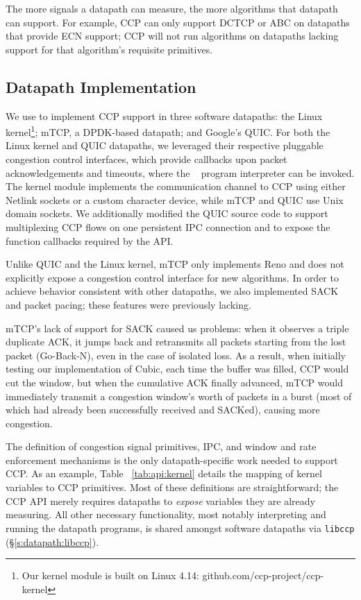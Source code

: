 The more signals a datapath can measure, the more algorithms that datapath can support. For example, CCP can only support DCTCP \cite{DCTCP} or ABC \cite{abc} on datapaths that provide ECN support; CCP will not run algorithms on datapaths lacking support for that algorithm’s requisite primitives.

\subsection{Datapath Implementation}
\label{s:datapath:software_datapaths}
We use  to implement CCP support in three software datapaths: the Linux kernel\footnote{Our kernel module is built on Linux 4.14: github.com/ccp-project/ccp-kernel}; mTCP, a DPDK-based datapath; and Google's QUIC.
For both the Linux kernel and QUIC datapaths, we leveraged their respective pluggable congestion control interfaces, which provide callbacks upon packet acknowledgements and timeouts, where the ~ program interpreter can be invoked.
The kernel module implements the communication channel to CCP using either Netlink sockets or a custom
character device, while mTCP and QUIC use Unix domain sockets.
We additionally modified the QUIC source code to support multiplexing CCP flows on one persistent IPC connection and to expose the function callbacks required by the  API.

Unlike QUIC and the Linux kernel, mTCP only implements Reno and does not explicitly expose a congestion control interface for new algorithms. 
In order to achieve behavior consistent with other datapaths, we also implemented SACK and packet pacing; these features were previously lacking.

mTCP's lack of support for SACK caused us problems: when it observes a triple duplicate ACK, 
it jumps back and retransmits all packets starting from the lost packet (\ie Go-Back-N), even in the case of isolated loss.
As a result, when initially testing our implementation of Cubic, each time the buffer was filled, CCP
would cut the window, but when the cumulative ACK finally advanced, mTCP would immediately transmit a congestion window’s worth of packets in a burst (most of which had already been successfully received and SACKed), causing more congestion. 

The definition of congestion signal primitives, IPC, and window and rate enforcement mechanisms is the only datapath-specific work needed to support CCP.
As an example, Table ~\ref{tab:api:kernel} details the mapping of kernel variables to CCP primitives.
Most of these definitions are straightforward; the CCP API merely requires datapaths to \textit{expose} variables they are already measuring.
All other necessary functionality, most notably interpreting and running the datapath programs, is shared amongst software datapaths via \texttt{libccp} (\S\ref{s:datapath:libccp}).

